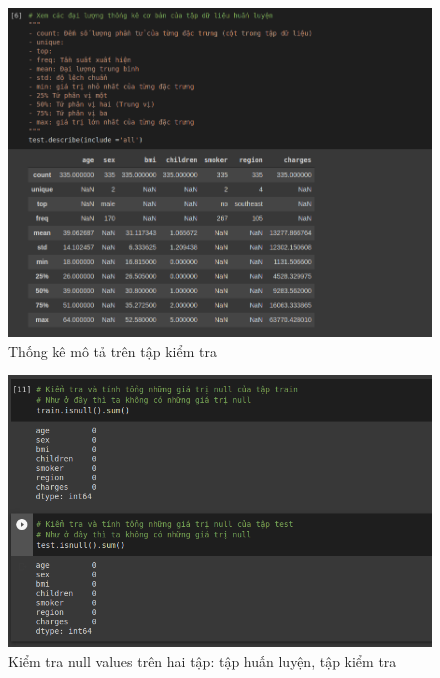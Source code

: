 \documentclass{article}
\begin{document}
	\begin{figure}[H]
		\centering
		\includegraphics[width=1\textwidth]{images/simple_stat_on_test_set.png}
		\caption{Thống kê mô tả trên tập kiểm tra}
		\label{fig:writing-thesis-simple-stat-on-test-set}
	\end{figure}

	\begin{figure}[H]
		\centering
		\includegraphics[width=1\textwidth]{images/check_null_train_test.png}
		\caption{Kiểm tra null values trên hai tập: tập huấn luyện, tập kiểm tra}
		\label{fig:writing-thesis-check-null-train-test}
	\end{figure}
\end{document}
